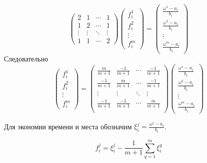 \documentclass[12pt,a4paper,titlepage,oneside]{book}
\theoremstyle{definition}
\theoremstyle{plain}
\theoremstyle{remark}
\theoremstyle{remark}
\theoremstyle{plain}
\theoremstyle{plain}
\begin{document}
\begin{equation*}
\begin{pmatrix}
2 & 1 & \cdots & 1\\
1 & 2 & \cdots & 1\\
\vdots & \vdots & \ddots & \vdots\\
1 & 1 & \cdots & 2 
\end{pmatrix}
\begin{pmatrix}
f_i^1 \\ f_i^2 \\ \vdots\\ f_i^m 
\end{pmatrix}
=
\begin{pmatrix}
\frac{\omega^1 - a_i}{b_i} \\ \frac{\omega^2 - a_i}{b_i} \\ \vdots \\ \frac{\omega^m - a_i}{b_i}
\end{pmatrix}
\end{equation*}
Следовательно
\begin{equation*}
\begin{pmatrix}
f_i^1 \\ f_i^2 \\ \vdots\\ f_i^m 
\end{pmatrix} 
=\begin{pmatrix}
\frac{m}{m+1} & \frac{-1}{m+1} & \cdots & \frac{-1}{m+1} \\
\frac{-1}{m+1} & \frac{m}{m+1} & \cdots & \frac{-1}{m+1} \\
\vdots & \vdots & \ddots & \vdots\\
\frac{-1}{m+1} & \frac{-1}{m+1} & \cdots & \frac{m}{m+1} \\
\end{pmatrix}
\begin{pmatrix}
\frac{\omega^1 - a_i}{b_i} \\ \frac{\omega^2 - a_i}{b_i} \\ \vdots \\ \frac{\omega^m - a_i}{b_i}
\end{pmatrix}
\end{equation*}

Для экономии времени и места обозначим $\xi_i^j = \frac{\omega^j - a_i}{b_i}$.

\begin{equation*}
f_i^j = \xi_i^j - \frac{1}{m+1} \sum\limits_{q=1}^m \xi_i^q
\end{equation*}
\end{document}
